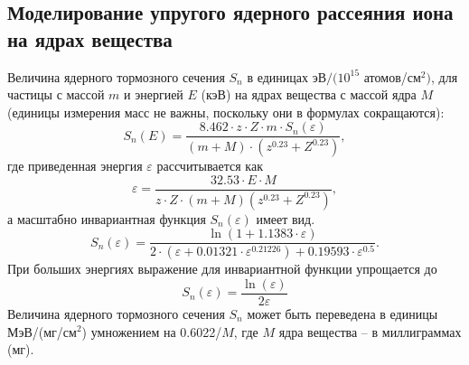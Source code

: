\documentclass[a4paper,12pt]{article}
\begin{document}
\begin{large}
  \subsection{Моделирование упругого ядерного рассеяния иона на ядрах вещества}
  \label{S_nuc}

 Величина ядерного тормозного сечения $S_n$ в единицах эВ$/(10^{15}$ атомов/см$^2)$, для частицы с массой $m$ и энергией $E$ (кэВ) на ядрах вещества с массой ядра $M$ (единицы измерения масс не важны, поскольку они в формулах сокращаются):
  \begin{equation}
  \label{Sn}
  S_n(E)=\frac{8.462\cdot z\cdot Z\cdot m\cdot S_n(\varepsilon)}{(m+M)\cdot(z^{0.23}+Z^{0.23})},
  \end{equation}
  где приведенная энергия $\varepsilon$ рассчитывается как
  \begin{equation}
  \label{epsilon}
  \varepsilon=\frac{32.53\cdot E\cdot M}{z\cdot Z\cdot (m+M)(z^{0.23}+Z^{0.23})},
  \end{equation}
  а масштабно инвариантная функция $S_n(\varepsilon)$ имеет вид.
  \begin{equation}
  \label{SnepsilonLow}
  S_n(\varepsilon)=\frac{\ln(1+1.1383\cdot\varepsilon)}{2\cdot (\varepsilon+0.01321\cdot\varepsilon^{0.21226})+0.19593\cdot\varepsilon^{0.5}}.
  \end{equation}
  При больших энергиях выражение для инвариантной функции упрощается до
  \begin{equation}
  \label{SnepsilonHigh}
  S_n(\varepsilon)=\frac{\ln(\varepsilon)}{2\varepsilon}
  \end{equation}
  Величина ядерного тормозного сечения $S_n$ может быть переведена в единицы МэВ/(мг/см$^2$) умножением на 0.6022/$M$, где $M$ ядра вещества -- в миллиграммах (мг).
  

\end{large}
\end{document}
